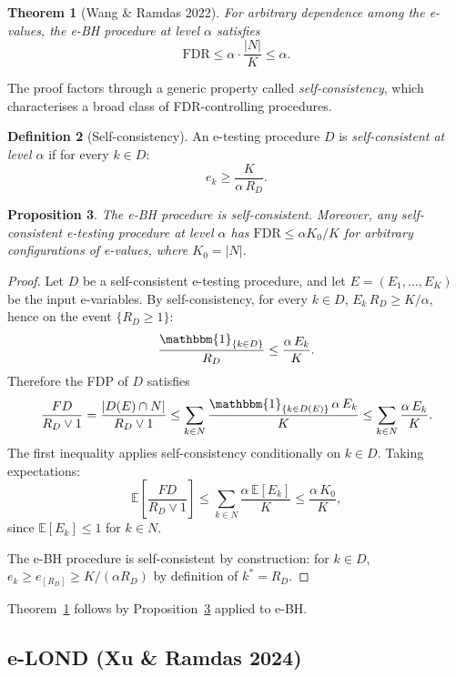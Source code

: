 \documentclass[11pt,a4paper]{article}
\theoremstyle{plain}
\newtheorem{theorem}{Theorem}[section]
\newtheorem{proposition}[theorem]{Proposition}
\theoremstyle{definition}
\newtheorem{definition}[theorem]{Definition}
\theoremstyle{remark}
\newcommand{\E}{\mathbb{E}}
\newcommand{\ind}{\mathbbm{1}}
\newcommand{\FDR}{\mathrm{FDR}}
\begin{document}
\begin{theorem}[Wang \& Ramdas 2022]\label{thm:ebh}
For arbitrary dependence among the e-values, the e-BH procedure at level
$\alpha$ satisfies
\[
  \FDR \leq \alpha \cdot \frac{|N|}{K} \leq \alpha.
\]
\end{theorem}

The proof factors through a generic property called \emph{self-consistency},
which characterises a broad class of FDR-controlling procedures.

\begin{definition}[Self-consistency]
An e-testing procedure $D$ is \emph{self-consistent at level $\alpha$} if for
every $k \in D$:
\[
  e_k \geq \frac{K}{\alpha\,R_D}.
\]
\end{definition}

\begin{proposition}\label{prop:sc}
The e-BH procedure is self-consistent. Moreover, any self-consistent
e-testing procedure at level $\alpha$ has $\FDR \leq \alpha K_0 / K$ for
arbitrary configurations of e-values, where $K_0 = |N|$.
\end{proposition}

\begin{proof}
Let $D$ be a self-consistent e-testing procedure, and let
$E = (E_1, \ldots, E_K)$ be the input e-variables. By self-consistency, for
every $k \in D$, $E_k\,R_D \geq K/\alpha$, hence on the event $\{R_D \geq 1\}$:
\[
  \frac{\ind_{\{k \in D\}}}{R_D} \leq \frac{\alpha\,E_k}{K}.
\]
Therefore the FDP of $D$ satisfies
\[
  \frac{FD}{R_D \vee 1}
    = \frac{|D(E) \cap N|}{R_D \vee 1}
    \leq \sum_{k \in N} \frac{\ind_{\{k \in D(E)\}}\,\alpha\,E_k}{K}
    \leq \sum_{k \in N} \frac{\alpha\,E_k}{K}.
\]
The first inequality applies self-consistency conditionally on $k \in D$.
Taking expectations:
\[
  \E\!\left[\frac{FD}{R_D \vee 1}\right]
    \leq \sum_{k \in N} \frac{\alpha\,\E[E_k]}{K}
    \leq \frac{\alpha\,K_0}{K},
\]
since $\E[E_k] \leq 1$ for $k \in N$.

The e-BH procedure is self-consistent by construction: for $k \in D$,
$e_k \geq e_{[R_D]} \geq K/(\alpha R_D)$ by definition of $k^* = R_D$.
\end{proof}

Theorem~\ref{thm:ebh} follows by Proposition~\ref{prop:sc} applied to e-BH.


\subsection{e-LOND (Xu \& Ramdas 2024)}
\label{sec:elond}
\end{document}
